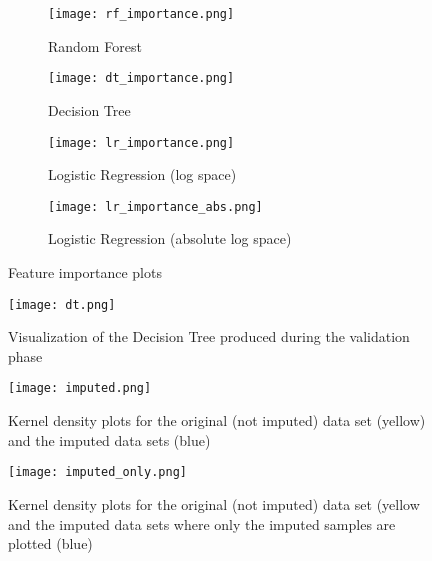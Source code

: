 \begin{figure}
 \begin{subfigure}{0.5\textwidth}
  \texttt{[image: rf\_importance.png]}
  \caption{Random Forest}
  \label{fig:rf_importance}
 \end{subfigure}
 \begin{subfigure}{0.5\textwidth}
  \texttt{[image: dt\_importance.png]}
  \caption{Decision Tree}
  \label{fig:dt_importance}
 \end{subfigure}
 \begin{subfigure}{0.5\textwidth}
  \texttt{[image: lr\_importance.png]}
  \caption{Logistic Regression (log space)}
  \label{fig:lr_importance}
 \end{subfigure}
 \begin{subfigure}{0.5\textwidth}
  \texttt{[image: lr\_importance\_abs.png]}
  \caption{Logistic Regression (absolute log space)}
  \label{fig:lr_importance_abs}
 \end{subfigure}

 \caption{Feature importance plots}
 \label{fig:feature-importance}
\end{figure}
\begin{figure}
 \texttt{[image: dt.png]}
 \caption{Visualization of the Decision Tree produced during the validation 
phase}
 \label{fig:dt}
\end{figure}
\begin{figure}
 \texttt{[image: imputed.png]}
 \label{fig:imputed}
 \caption{Kernel density plots for the original (not imputed) data set (yellow) 
and the imputed data sets (blue)}
\end{figure}
\begin{figure}
 \texttt{[image: imputed\_only.png]}
 \label{fig:imputed-only}
  \caption{Kernel density plots for the original (not imputed) data set 
(yellow and the imputed data sets where only the imputed samples are plotted 
(blue)}
\end{figure}





